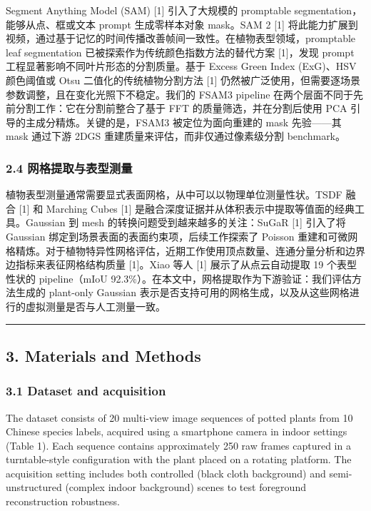 \documentclass[11pt,a4paper]{article}
\begin{document}
Segment Anything Model (SAM) {[}1{]} 引入了大规模的 promptable
segmentation，能够从点、框或文本 prompt 生成零样本对象 mask。SAM 2
{[}1{]}
将此能力扩展到视频，通过基于记忆的时间传播改善帧间一致性。在植物表型领域，promptable
leaf segmentation 已被探索作为传统颜色指数方法的替代方案 {[}1{]}，发现
prompt 工程显著影响不同叶片形态的分割质量。基于 Excess Green Index
(ExG)、HSV 颜色阈值或 Otsu 二值化的传统植物分割方法 {[}1{]}
仍然被广泛使用，但需要逐场景参数调整，且在变化光照下不稳定。我们的 FSAM3
pipeline 在两个层面不同于先前分割工作：它在分割前整合了基于 FFT
的质量筛选，并在分割后使用 PCA 引导的主成分精炼。关键的是，FSAM3
被定位为面向重建的 mask 先验------其 mask 通过下游 2DGS
重建质量来评估，而非仅通过像素级分割 benchmark。

\subsubsection{2.4
网格提取与表型测量}\label{ux7f51ux683cux63d0ux53d6ux4e0eux8868ux578bux6d4bux91cf}

植物表型测量通常需要显式表面网格，从中可以以物理单位测量性状。TSDF 融合
{[}1{]} 和 Marching Cubes {[}1{]}
是融合深度证据并从体积表示中提取等值面的经典工具。Gaussian 到 mesh
的转换问题受到越来越多的关注：SuGaR {[}1{]} 引入了将 Gaussian
绑定到场景表面的表面约束项，后续工作探索了 Poisson
重建和可微网格精炼。对于植物特异性网格评估，近期工作使用顶点数量、连通分量分析和边界边指标来表征网格结构质量
{[}1{]}。Xiao 等人 {[}1{]} 展示了从点云自动提取 19 个表型性状的
pipeline（mIoU
92.3\%）。在本文中，网格提取作为下游验证：我们评估方法生成的 plant-only
Gaussian
表示是否支持可用的网格生成，以及从这些网格进行的虚拟测量是否与人工测量一致。

\begin{center}\rule{0.5\linewidth}{0.5pt}\end{center}

\subsection{3. Materials and Methods}\label{materials-and-methods}

\subsubsection{3.1 Dataset and
acquisition}\label{dataset-and-acquisition}

The dataset consists of 20 multi-view image sequences of potted plants
from 10 Chinese species labels, acquired using a smartphone camera in
indoor settings (Table 1). Each sequence contains approximately 250 raw
frames captured in a turntable-style configuration with the plant placed
on a rotating platform. The acquisition setting includes both controlled
(black cloth background) and semi-unstructured (complex indoor
background) scenes to test foreground reconstruction robustness.
\end{document}
